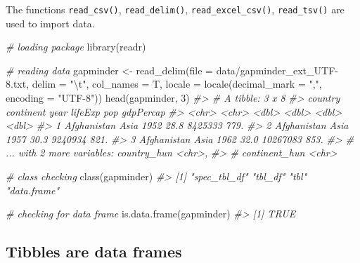 \documentclass[
]{book}
\newenvironment{Shaded}{\begin{snugshade}}{\end{snugshade}}
\newcommand{\AttributeTok}[1]{\textcolor[rgb]{0.77,0.63,0.00}{#1}}
\newcommand{\CommentTok}[1]{\textcolor[rgb]{0.56,0.35,0.01}{\textit{#1}}}
\newcommand{\DecValTok}[1]{\textcolor[rgb]{0.00,0.00,0.81}{#1}}
\newcommand{\FunctionTok}[1]{\textcolor[rgb]{0.00,0.00,0.00}{#1}}
\newcommand{\NormalTok}[1]{#1}
\newcommand{\OtherTok}[1]{\textcolor[rgb]{0.56,0.35,0.01}{#1}}
\newcommand{\SpecialCharTok}[1]{\textcolor[rgb]{0.00,0.00,0.00}{#1}}
\newcommand{\StringTok}[1]{\textcolor[rgb]{0.31,0.60,0.02}{#1}}
\begin{document}
The functions \texttt{read\_csv()}, \texttt{read\_delim()}, \texttt{read\_excel\_csv()}, \texttt{read\_tsv()} are used to import data.

\begin{Shaded}
\begin{Highlighting}[]
\CommentTok{\# loading package}
\FunctionTok{library}\NormalTok{(readr)}

\CommentTok{\# reading data}
\NormalTok{gapminder }\OtherTok{\textless{}{-}} \FunctionTok{read\_delim}\NormalTok{(}\AttributeTok{file =} \StringTok{\textquotesingle{}data/gapminder\_ext\_UTF{-}8.txt\textquotesingle{}}\NormalTok{, }
                        \AttributeTok{delim =} \StringTok{"}\SpecialCharTok{\textbackslash{}t}\StringTok{"}\NormalTok{, }
                        \AttributeTok{col\_names =}\NormalTok{ T, }
                        \AttributeTok{locale =} \FunctionTok{locale}\NormalTok{(}\AttributeTok{decimal\_mark =} \StringTok{","}\NormalTok{,  }\AttributeTok{encoding =} \StringTok{"UTF{-}8"}\NormalTok{))}
\FunctionTok{head}\NormalTok{(gapminder, }\DecValTok{3}\NormalTok{)}
\CommentTok{\#\textgreater{} \# A tibble: 3 x 8}
\CommentTok{\#\textgreater{}   country     continent  year lifeExp      pop gdpPercap}
\CommentTok{\#\textgreater{}   \textless{}chr\textgreater{}       \textless{}chr\textgreater{}     \textless{}dbl\textgreater{}   \textless{}dbl\textgreater{}    \textless{}dbl\textgreater{}     \textless{}dbl\textgreater{}}
\CommentTok{\#\textgreater{} 1 Afghanistan Asia       1952    28.8  8425333      779.}
\CommentTok{\#\textgreater{} 2 Afghanistan Asia       1957    30.3  9240934      821.}
\CommentTok{\#\textgreater{} 3 Afghanistan Asia       1962    32.0 10267083      853.}
\CommentTok{\#\textgreater{} \# ... with 2 more variables: country\_hun \textless{}chr\textgreater{},}
\CommentTok{\#\textgreater{} \#   continent\_hun \textless{}chr\textgreater{}}

\CommentTok{\# class checking}
\FunctionTok{class}\NormalTok{(gapminder)}
\CommentTok{\#\textgreater{} [1] "spec\_tbl\_df" "tbl\_df"      "tbl"         "data.frame"}

\CommentTok{\# checking for data frame }
\FunctionTok{is.data.frame}\NormalTok{(gapminder)}
\CommentTok{\#\textgreater{} [1] TRUE}
\end{Highlighting}
\end{Shaded}

\hypertarget{tibbles-are-data-frames}{%
\subsection{Tibbles are data frames}\label{tibbles-are-data-frames}}
\end{document}
